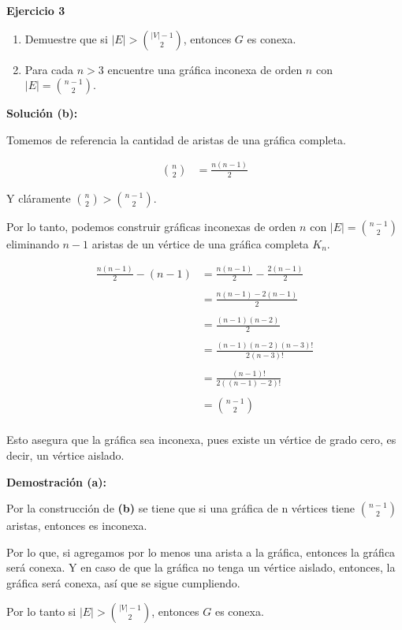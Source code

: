 \textbf{Ejercicio 3}
\begin{enumerate}[label = (\alph*)]
	\item Demuestre que si $|E| > \binom{|V|-1}{2}$, entonces $G$ es conexa.

	\item Para cada $n > 3$ encuentre una gráfica inconexa de orden
		  $n$ con $|E| = \binom{n-1}{2}$.
\end{enumerate}

\textbf{Solución (b):}

Tomemos de referencia la cantidad de aristas de una gráfica completa.

\begin{align*}
	\binom{n}{2} &= \frac{n(n-1)}{2}
\end{align*}

Y cláramente $\binom{n}{2} > \binom{n-1}{2}$.

Por lo tanto, podemos construir gráficas inconexas de orden $n$ con	
$|E| = \binom{n-1}{2}$ eliminando $n-1$ aristas de un vértice de una 
gráfica completa $K_n$.

\begin{align*}
	\frac{n(n-1)}{2} - (n-1) &= \frac{n(n-1)}{2} - \frac{2(n-1)}{2} \\
	\\
	&= \frac{n(n-1)-2(n-1)}{2} \\
	\\
	&= \frac{(n-1)(n-2)}{2} \\
	\\
	&= \frac{(n-1)(n-2)(n-3)!}{2(n-3)!} \\
	\\
	&= \frac{(n-1)!}{2((n-1)-2)!} \\
	\\
	&= \binom{n-1}{2} \\ 
\end{align*}

Esto asegura que la gráfica sea inconexa, pues existe un vértice de grado 
cero, es decir, un vértice aislado.
 


\textbf{Demostración (a):}

Por la construcción de \textbf{(b)} se tiene que si una gráfica de n vértices 
tiene $\binom{n-1}{2}$ aristas, entonces es inconexa. 

Por lo que, si agregamos por lo menos una arista a la gráfica, entonces 
la gráfica será conexa. Y en caso de que la gráfica no tenga un vértice 
aislado, entonces, la gráfica será conexa, así que se sigue cumpliendo.

Por lo tanto si $|E| > \binom{|V|-1}{2}$, entonces $G$ es conexa.

\QED

